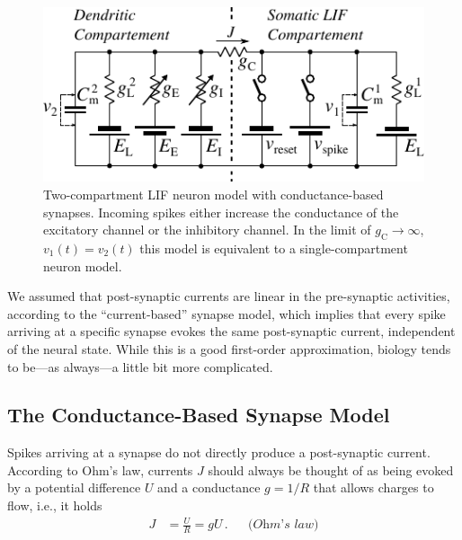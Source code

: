 \documentclass[10pt,letterpaper,oneside]{article}
\begin{document}
\begin{figure}
	\centering
	\includegraphics{media/neuron_model.pdf}
	\caption{Two-compartment LIF neuron model with conductance-based synapses. Incoming spikes either increase the conductance of the excitatory channel or the inhibitory channel. In the limit of $g_\mathrm{C} \to \infty$, $v_1(t) = v_2(t)$ this model is equivalent to a single-compartment neuron model.}
	\label{fig:neuron_model}
\end{figure}

We assumed that post-synaptic currents are linear in the pre-synaptic activities, according to the \enquote{current-based} synapse model, which implies that every spike arriving at a specific synapse evokes the same post-synaptic current, independent of the neural state. While this is a good first-order approximation, biology tends to be---as always---a little bit more complicated.

\subsection{The Conductance-Based Synapse Model}

Spikes arriving at a synapse do not directly produce a post-synaptic current. According to Ohm's law, currents $J$ should always be thought of as being evoked by a potential difference $U$ and a conductance $g = 1/R$ that allows charges to flow, i.e., it holds
\begin{align*}
	J &= \frac{U}R = g U \,. && \textit{(Ohm's law)}
\end{align*}
\end{document}

